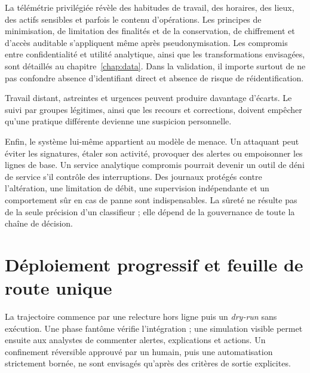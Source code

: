 \documentclass[11pt,a4paper,oneside]{report}
\theoremstyle{definition}
\theoremstyle{plain}
\begin{document}
La télémétrie privilégiée révèle des habitudes de travail, des horaires, des
lieux, des actifs sensibles et parfois le contenu d'opérations. Les principes
de minimisation, de limitation des finalités et de la conservation, de
chiffrement et d'accès auditable s'appliquent même après pseudonymisation. Les
compromis entre confidentialité et utilité analytique, ainsi que les
transformations envisagées, sont détaillés au chapitre~\ref{chap:data}. Dans la
validation, il importe surtout de ne pas confondre absence d'identifiant direct
et absence de risque de réidentification.

Travail distant, astreintes et urgences peuvent produire davantage d'écarts.
Le suivi par groupes légitimes, ainsi que les recours et corrections, doivent
empêcher qu'une pratique différente devienne une suspicion personnelle.

Enfin, le système lui-même appartient au modèle de menace. Un attaquant peut
éviter les signatures, étaler son activité, provoquer des alertes ou empoisonner
les lignes de base. Un service analytique compromis pourrait devenir un outil
de déni de service s'il contrôle des interruptions. Des journaux protégés
contre l'altération, une limitation de débit, une supervision indépendante et
un comportement sûr en cas de panne sont indispensables. La sûreté ne résulte
pas de la seule précision d'un classifieur ; elle dépend de la gouvernance de
toute la chaîne de décision.

\section{Déploiement progressif et feuille de route unique}
\label{sec:validation-roadmap}

La trajectoire commence par une relecture hors ligne puis un \emph{dry-run}
sans exécution. Une phase fantôme vérifie l'intégration ; une simulation visible
permet ensuite aux analystes de commenter alertes, explications et actions.
Un confinement réversible approuvé par un humain, puis une automatisation
strictement bornée, ne sont envisagés qu'après des critères de sortie explicites.
\end{document}
